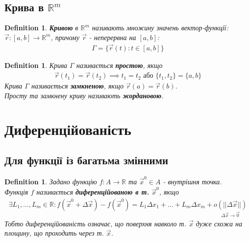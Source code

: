 \documentclass[a4paper, 10pt]{article}
\theoremstyle{theoremdd}
\theoremstyle{theoremdd}
\theoremstyle{theoremdd}
\newtheorem{definition}[theorem]{Definition}
\theoremstyle{theoremdd}
\theoremstyle{theoremdd}
\theoremstyle{theoremdd}
\theoremstyle{theoremdd}
\theoremstyle{theoremdd}
\theoremstyle{theoremdd}
\begin{document}
\subsection{Крива в $\mathbb{R}^m$}
\begin{definition}
\textbf{Кривою} в $\mathbb{R}^m$ називають множину значень вектор-функції: $\vec{r}: [a,b] \to \mathbb{R}^m$, причому $\vec{r}$ - неперервна на $[a,b]$:
\begin{align*}
\Gamma = \{ \vec{r}(t): t \in [a,b]\}
\end{align*}
\end{definition}

\begin{definition}
Крива $\Gamma$ називається \textbf{простою}, якщо
\begin{align*}
\vec{r}(t_1) = \vec{r}(t_2) \implies t_1 = t_2 \text{ або } \{t_1,t_2\} = \{a,b\}
\end{align*}
Крива $\Gamma$ називається \textbf{замкненою}, якщо $\vec{r}(a) = \vec{r}(b)$.\\
Просту та замкнену криву називають \textbf{жордановою}.
\end{definition}

\newpage

\section{Диференційованість}
\subsection{Для функції із багатьма змінними}
\begin{definition}
Задано функцію $f: A \to \mathbb{R}$ та $\vec{x}^0 \in A$ - внутрішня точка.\\
Функція $f$ називається \textbf{диференційованою в т.} $\vec{x}^0$, якщо
\begin{align*}
\exists L_1,\dots, L_m \in \mathbb{R}: f(\vec{x}^0 + \Delta \vec{x}) - f(\vec{x}^0) = L_1 \Delta x_1 + \dots + L_m \Delta x_m + \underset{\Delta \vec{x} \to \vec{0}}{o(||\Delta \vec{x}||)}
\end{align*}
Тобто диференційованість означає, що поверхня навколо т. $\vec{x}$ дуже схожа на площину, що проходить через т. $\vec{x}$.
\end{definition}
\end{document}
